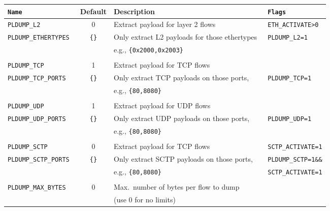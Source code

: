 \documentclass[documentation]{subfiles}
\begin{document}
\begin{longtable}{>{\tt}lcl>{\tt\small}l}
    \toprule
    {\bf Name} & {\bf Default} & {\bf Description} & {\bf Flags}\\
    \midrule\endhead%
    PLDUMP\_L2          & 0 & Extract payload for layer 2 flows                             & ETH\_ACTIVATE>0\\
    PLDUMP\_ETHERTYPES  & {\tt\small \{\}}
                            & Only extract L2 payloads for those ethertypes                 & PLDUMP\_L2=1\\
                        &   & \qquad e.g., {\tt\small \{0x2000,0x2003\}}                    & \\
    \\
    PLDUMP\_TCP         & 1 & Extract payload for TCP flows                                 & \\
    PLDUMP\_TCP\_PORTS  & {\tt\small \{\}}
                            & Only extract TCP payloads on those ports,                     & PLDUMP\_TCP=1\\
                        &   & \qquad e.g., {\tt\small \{80,8080\}}                          & \\
    \\
    PLDUMP\_UDP         & 1 & Extract payload for UDP flows                                 & \\
    PLDUMP\_UDP\_PORTS  & {\tt\small \{\}}
                            & Only extract UDP payloads on those ports,                     & PLDUMP\_UDP=1\\
                        &   & \qquad e.g., {\tt\small \{80,8080\}}                          & \\
    \\
    PLDUMP\_SCTP        & 0 & Extract payload for TCP flows                                 & SCTP\_ACTIVATE=1\\
    PLDUMP\_SCTP\_PORTS & {\tt\small \{\}}
                            & Only extract SCTP payloads on those ports,                    & PLDUMP\_SCTP=1\&\&\\
                        &   & \qquad e.g., {\tt\small \{80,8080\}}                          & SCTP\_ACTIVATE=1\\
    \\
    PLDUMP\_MAX\_BYTES  & 0 & Max.\ number of bytes per flow to dump                        & \\
                        &   & \qquad (use 0 for no limits)                                  & \\

\end{longtable}
\end{document}
